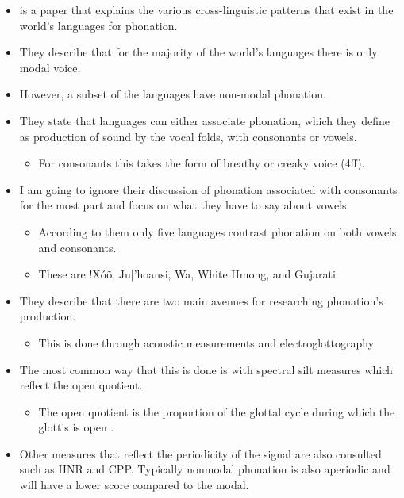 \begin{itemize}
    \item \citet{espositoCrossLinguisticPatterns2020} is a paper that explains the various cross-linguistic patterns that exist in the world's languages for phonation. 
    \item They describe that for the majority of the world's languages there is only modal voice. 
    \item However, a subset of the languages have non-modal phonation. 
    \item They state that languages can either associate phonation, which they define as production of sound by the vocal folds, with consonants or vowels. 
    \begin{itemize}
        \item For consonants this takes the form of breathy or creaky voice (4ff).
    \end{itemize}
    \item I am going to ignore their discussion of phonation associated with consonants for the most part and focus on what they have to say about vowels. 
    \begin{itemize}
        \item According to them only five languages contrast phonation on both vowels and consonants. 
        \item These are !Xóõ, Ju|'hoansi, Wa, White Hmong, and Gujarati
    \end{itemize}
    \item They describe that there are two main avenues for researching phonation's production. 
    \begin{itemize}
        \item This is done through acoustic measurements and electroglottography
    \end{itemize}
    \item The most common way that this is done is with spectral silt measures which reflect the open quotient.
    \begin{itemize}
        \item The open quotient is the proportion of the glottal cycle during which the glottis is open \citep{holmbergComparisonsAerodynamicElectroglottographic1995}. 
    \end{itemize} 
    \item Other measures that reflect the periodicity of the signal are also consulted such as HNR and CPP. Typically nonmodal phonation is also aperiodic and will have a lower score compared to the modal. 

\end{itemize}
